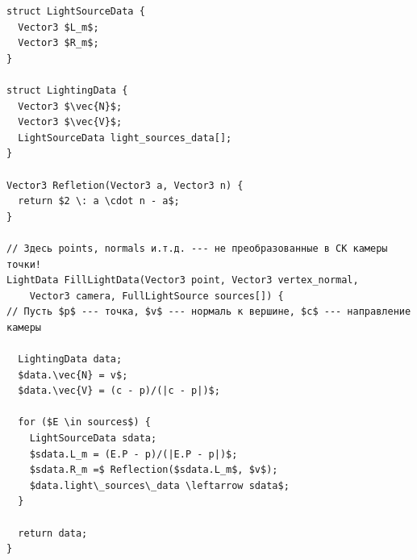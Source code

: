 \documentclass[a4paper,12pt]{report}
\numberwithin{equation}{section}
\begin{document}
\begin{lstlisting}[float=!h,caption={Нахождение векторов для освещения по Фонгу},label=lighting_vectors_algo]
struct LightSourceData {
  Vector3 $L_m$;
  Vector3 $R_m$;
}

struct LightingData {
  Vector3 $\vec{N}$;
  Vector3 $\vec{V}$;
  LightSourceData light_sources_data[];
}

Vector3 Refletion(Vector3 a, Vector3 n) {
  return $2 \: a \cdot n - a$;
}

// Здесь points, normals и.т.д. --- не преобразованные в СК камеры точки!
LightData FillLightData(Vector3 point, Vector3 vertex_normal,
    Vector3 camera, FullLightSource sources[]) {
// Пусть $p$ --- точка, $v$ --- нормаль к вершине, $c$ --- направление камеры

  LightingData data;
  $data.\vec{N} = v$;
  $data.\vec{V} = (c - p)/(|c - p|)$;
  
  for ($E \in sources$) {
    LightSourceData sdata;
    $sdata.L_m = (E.P - p)/(|E.P - p|)$;
    $sdata.R_m =$ Reflection($sdata.L_m$, $v$);
    $data.light\_sources\_data \leftarrow sdata$;
  }
  
  return data;
}
\end{lstlisting}
\end{document}

